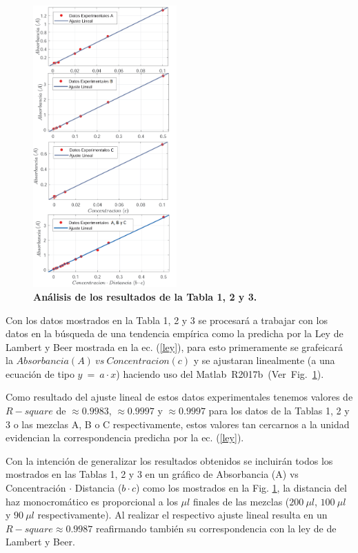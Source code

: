 \begin{figure}
    \includegraphics[width=0.49\textwidth]{Tarea2/absorbancia.png}
    \caption{\textbf{Análisis de los resultados de la Tabla 1, 2 y 3.}}
    \label{fig2.1}
\end{figure}

Con los datos mostrados en la Tabla 1, 2 y 3 se procesará a trabajar con los datos en la búsqueda de una tendencia empírica como la predicha por la Ley de Lambert y Beer mostrada en la ec. (\ref{ley}), para esto primeramente se grafeicará la $Absorbancia (A)~ vs~ Concentracion (c)$ y se ajustaran linealmente (a una ecuación de tipo $y~=~a\cdot x$) haciendo uso del Matlab~R2017b~(Ver~Fig.~\ref{fig2.1}).

Como resultado del ajuste lineal de estos datos experimentales tenemos valores de $R-square$ de $\approx 0.9983$, $\approx 0.9997$ y $\approx 0.9997$ para los datos de la Tablas 1, 2 y 3 o las mezclas A, B o C respectivamente, estos valores tan cercarnos a la unidad evidencian la correspondencia predicha por la ec. (\ref{ley}).

Con la intención de generalizar los resultados obtenidos se incluirán todos los mostrados en las Tablas 1, 2 y 3 en un gráfico de Absorbancia (A) vs Concentración $\cdot$ Distancia ($b\cdot c$) como los mostrados en la Fig. \ref{fig2.1}, la distancia del haz monocromático es proporcional a los $\mu l$ finales de las mezclas ($200~\mu l$, $100~\mu l$ y $90~\mu l$ respectivamente). Al realizar el respectivo ajuste lineal resulta en un $R-square \approx 0.9987$ reafirmando también su correspondencia con la ley de de Lambert y Beer.


